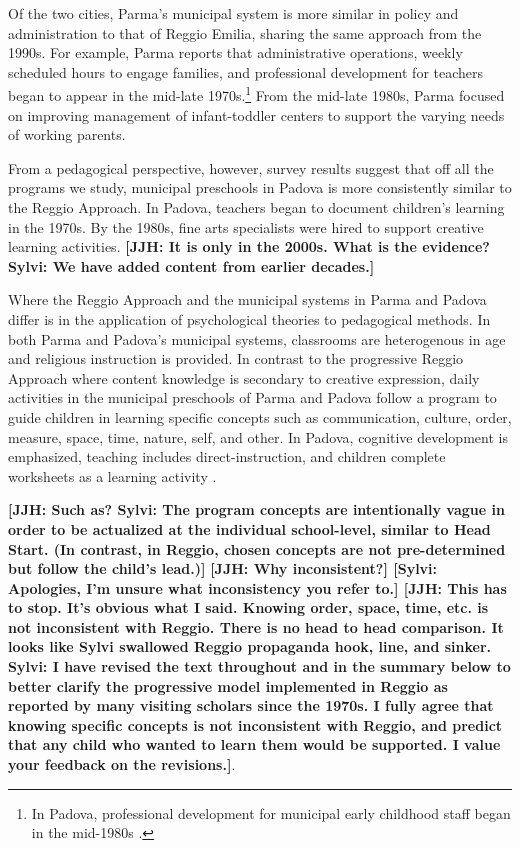 Of the two cities, Parma's municipal system is more similar in policy and administration to that of Reggio Emilia, sharing the same approach from the 1990s. For example, Parma reports that administrative operations, weekly scheduled hours to engage families, and professional development for teachers began to appear in the mid-late 1970s.\footnote{In Padova, professional development for municipal early childhood staff began in the mid-1980s \citep{Becchi-Ferrari_1990_Pub-Inf-Centres-Italy}.} From the mid-late 1980s, Parma focused on improving management of infant-toddler centers to support the varying needs of working parents. 

From a pedagogical perspective, however, survey results suggest that off all the programs we study, municipal preschools in Padova is more consistently similar to the Reggio Approach. In Padova, teachers began to document children's learning in the 1970s. By the 1980s, fine arts specialists were hired to support creative learning activities. 
\textbf{[JJH: It is only in the 2000s. What is the evidence? Sylvi: We have added content from earlier decades.]} 

Where the Reggio Approach and the municipal systems in Parma and Padova differ is in the application of psychological theories to pedagogical methods. In both Parma and Padova's municipal systems, classrooms are heterogenous in age and religious instruction is provided. In contrast to the progressive Reggio Approach where content knowledge is secondary to creative expression, daily activities in the municipal preschools of Parma and Padova follow a program to guide children in learning specific concepts such as communication, culture, order, measure, space, time, nature, self, and other. In Padova, cognitive development is emphasized, teaching includes direct-instruction, and children complete worksheets as a learning activity \citep{CEHD_2016_Historical-Analysis}. 

\textbf{[JJH: Such as? Sylvi: The program concepts are intentionally vague in order to be actualized at the individual school-level, similar to Head Start. (In contrast, in Reggio, chosen concepts are not pre-determined but follow the child's lead.)]} \textbf{[JJH: Why inconsistent?] [Sylvi: Apologies, I'm unsure what inconsistency you refer to.] [JJH: This has to stop. It's obvious what I said. Knowing order, space, time, etc. is not inconsistent with Reggio. There is no head to head comparison. It looks like Sylvi swallowed Reggio propaganda hook, line, and sinker. Sylvi: I have revised the text throughout and in the summary below to better clarify the progressive model implemented in Reggio as reported by many visiting scholars since the 1970s. I fully agree that knowing specific concepts is not inconsistent with Reggio, and predict that any child who wanted to learn them would be supported. I value your feedback on the revisions.]}.

